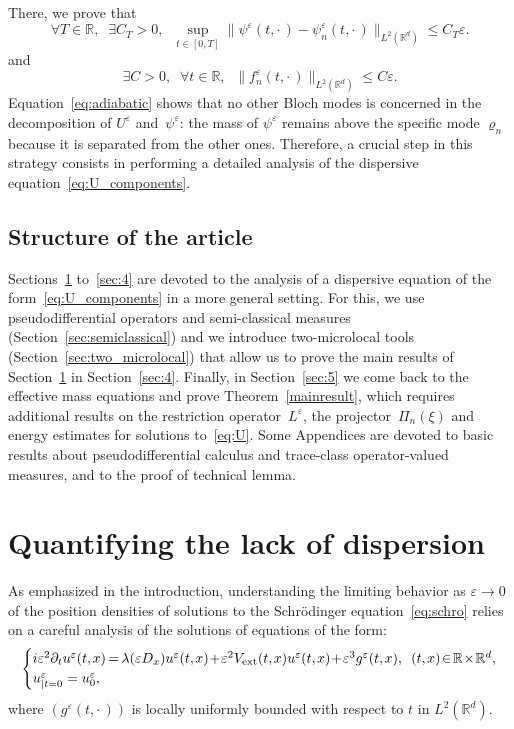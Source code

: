 \documentclass[10pt]{amsart}
\theoremstyle{definition}
\DeclareMathOperator{\ext}{ext}
\newcommand*\R{{\mathbb R}}
\newcommand*\eps{\varepsilon}
\numberwithin{equation}{section}
\newcommand*{\mk}{\mkern -1mu}
\newcommand*{\Mk}{\mkern -2mu}
\let\oldexists\exists
\renewcommand*{\exists}{\mathrel{\oldexists}}
\let\oldforall\forall
\renewcommand*{\forall}{\mathrel{\oldforall}}
\begin{document}
\goodbreak
There, we prove that
\begin{equation}\label{eq:adiabatic}
\forall T\in\R,\;\;\exists C_T>0,\;\; \sup_{t\in[0,T]} \| \psi^\eps(t,\cdot\,)- \psi^\eps_n(t,\cdot\,)\|_{L^2(\R^d)}\leq C_T \eps.
\end{equation}
and
\begin{equation}\label{eq:fneps}
\exists C>0,\;\;
\forall t\in\R,\;\;\|f_n^\eps(t,\cdot\,)\|_{L^2(\R^d)}\leq C\eps.
\end{equation}
Equation~\eqref{eq:adiabatic} shows that no other Bloch modes is concerned in the decomposition of $U^\eps$ and~$\psi^\eps$: the mass of $\psi^\eps$ remains above the specific mode $\varrho_n$ because it is separated from the other ones. Therefore, a crucial step in this strategy consists in performing a detailed analysis of the dispersive equation~\eqref{eq:U_components}.



\subsection{Structure of the article}
Sections~\ref{sec:disp} to~\ref{sec:4} are devoted to the analysis of a dispersive equation of the form~\eqref{eq:U_components} in a more general setting. For this, we use pseudodifferential operators and semi-classical measures (Section~\ref{sec:semiclassical}) and we introduce two-microlocal tools (Section~\ref{sec:two_microlocal}) that allow us to prove the main results of Section~\ref{sec:disp} in Section~\ref{sec:4}. Finally, in Section~\ref{sec:5} we come back to the effective mass equations and prove Theorem~\ref{mainresult}, which requires additional results on the restriction operator~$L^\eps$, the projector~$\Pi_n(\xi)$ and energy estimates for solutions to~\eqref{eq:U}. Some Appendices are devoted to basic results about pseudodifferential calculus and trace-class operator-valued measures, and to the proof of technical lemma.



\section{Quantifying the lack of dispersion}\label{sec:disp}

As emphasized in the introduction, understanding the limiting behavior as $\eps\to0$ of the position densities of solutions to the Schr\"odinger equation~\eqref{eq:schro} relies on a careful analysis of the solutions of equations of the form:
\begin{equation}\label{eq:disp2}
\!\!\begin{cases}
i\eps^2 \partial_{t} u^{\eps}(t,\mk x) \Mk=\Mk \lambda(\eps D_x) u^{\eps}(t,\mk x) \!+\! \eps^2 V_{\ext}(t,\mk x) u^{\eps}(t,\mk x)\!+\!\eps^3g^\eps(t,\mk x), &\!\!(t,\mk x)\!\in\!\R\!\times\!\R^d,\\
u^\eps_{|t=0}=u^\eps_0,
\end{cases}\!\!
\end{equation}
where $(g^\eps(t,\cdot\,))$ is locally uniformly bounded with respect to $t$ in $L^2(\R^d)$.
\end{document}
